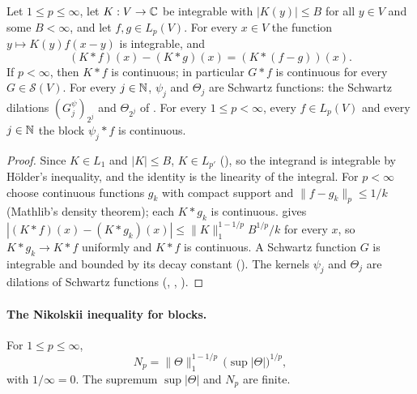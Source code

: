 \begin{lemma}
\label{lem:bounded-kernel-conv-continuous}
\leanok
{}
Let $1 \leq p \leq \infty$, let $K : V \to \mathbb{C}$ be integrable with $|K(y)| \leq B$ for all
$y \in V$ and some $B < \infty$, and let $f, g \in L_p(V)$. For every $x \in V$ the function
$y \mapsto K(y) f(x - y)$ is integrable, and
\[
  (K * f)(x) - (K * g)(x) = (K * (f - g))(x) .
\]
If $p < \infty$, then $K * f$ is continuous; in particular $G * f$ is continuous for every
$G \in \mathcal S(V)$. For every $j \in \mathbb{N}$, $\psi_j$ and $\Theta_j$ are Schwartz functions: the
Schwartz dilations $(G^{\psi}_j)_{2^j}$ and $\Theta_{2^j}$ of . For
every $1 \leq p < \infty$, every $f \in L_p(V)$ and every $j \in \mathbb{N}$ the block $\psi_j * f$ is
continuous.
\end{lemma}

\begin{proof}
\leanok
Since $K \in L_1$ and $|K| \leq B$, $K \in L_{p'}$ (), so the integrand
is integrable by H\"older's inequality, and the identity is the linearity of the integral. For
$p < \infty$ choose continuous functions $g_k$ with compact support and
$\|f - g_k\|_p \leq 1/k$ (Mathlib's density theorem); each $K * g_k$ is continuous.
 gives
$|(K * f)(x) - (K * g_k)(x)| \leq \|K\|_1^{1-1/p} B^{1/p} / k$ for every $x$, so $K * g_k \to K * f$
uniformly and $K * f$ is continuous. A Schwartz function $G$ is integrable and bounded by its
decay constant (). The kernels $\psi_j$ and $\Theta_j$ are dilations of
Schwartz functions (, , ).
\end{proof}

\paragraph{The Nikolskii inequality for blocks.}

\begin{definition}
\label{def:nikolskii-block-const}
\leanok
{}
For $1 \leq p \leq \infty$,
\[
  N_p = \|\Theta\|_1^{1 - 1/p} \, \bigl(\sup |\Theta|\bigr)^{1/p} ,
\]
with $1/\infty = 0$. The supremum $\sup |\Theta|$ and $N_p$ are finite.
\end{definition}


